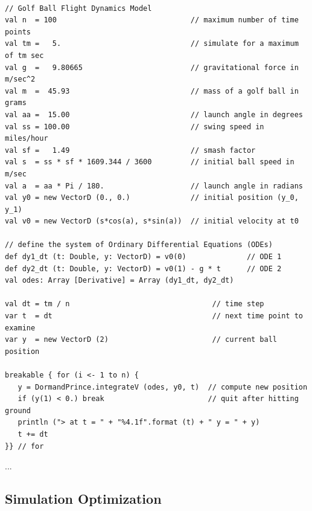 \documentclass{wscpaperproc}
\theoremstyle{wsc}
\begin{document}
\begin{small}
\begin{verbatim}

// Golf Ball Flight Dynamics Model
val n  = 100                               // maximum number of time points
val tm =   5.                              // simulate for a maximum of tm sec
val g  =   9.80665                         // gravitational force in m/sec^2
val m  =  45.93                            // mass of a golf ball in grams
val aa =  15.00                            // launch angle in degrees
val ss = 100.00                            // swing speed in miles/hour
val sf =   1.49                            // smash factor
val s  = ss * sf * 1609.344 / 3600         // initial ball speed in m/sec
val a  = aa * Pi / 180.                    // launch angle in radians
val y0 = new VectorD (0., 0.)              // initial position (y_0, y_1)
val v0 = new VectorD (s*cos(a), s*sin(a))  // initial velocity at t0

// define the system of Ordinary Differential Equations (ODEs)
def dy1_dt (t: Double, y: VectorD) = v0(0)              // ODE 1
def dy2_dt (t: Double, y: VectorD) = v0(1) - g * t      // ODE 2
val odes: Array [Derivative] = Array (dy1_dt, dy2_dt)

val dt = tm / n                                 // time step
var t  = dt                                     // next time point to examine
var y  = new VectorD (2)                        // current ball position

breakable { for (i <- 1 to n) {
   y = DormandPrince.integrateV (odes, y0, t)  // compute new position
   if (y(1) < 0.) break                        // quit after hitting ground
   println ("> at t = " + "%4.1f".format (t) + " y = " + y)
   t += dt
}} // for

\end{verbatim}
\end{small}

...

\subsection{Simulation Optimization}
\end{document}
